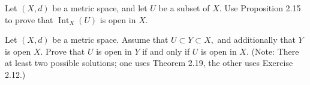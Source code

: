 \documentclass[12pt,letterpaper,boxed]{hmcpset}
\DeclareMathOperator{\Int}{Int}
\begin{document}
\begin{problem}[Exercise 2.16.]
Let $(X, d)$ be a metric space, and let $U$ be a subset of $X$. Use Proposition 2.15 to prove that $\Int_{X}(U)$ is open in $X$.
\end{problem}
\begin{solution}

\end{solution}

\begin{problem}[Exercise 2.20.]
Let $(X, d)$ be a metric space. Assume that $U\subset Y\subset X,$ and additionally that $Y$ is open $X$. Prove that $U$ is open in $Y$ if and only if $U$ is open in $X$. (Note: There at least two possible solutions; one uses Theorem 2.19, the other uses Exercise 2.12.)
\end{problem}
\begin{solution}

\end{solution}
\end{document}
